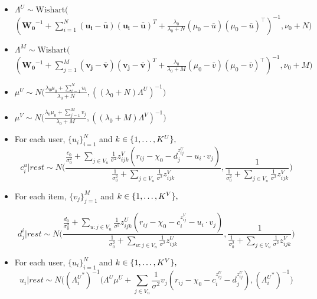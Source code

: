 \documentclass{article}
\begin{document}
\begin{itemize}

\item $\Lambda^U \sim \text{Wishart} \Bigg($
$\left(\mathbf{W_0}^{-1} + \sum_{i=1}^N (\mathbf{u_i} - \mathbf{\bar u}) (\mathbf{u_i} - \mathbf{\bar u})^T + \frac{\lambda_0}{\lambda_0 + N}(\mu_0 - \bar u)(\mu_0 - \bar u)^\top \right)^{-1}, \nu_0 + N \Bigg) $

\item $\Lambda^M \sim \text{Wishart} \Bigg($
$\left(\mathbf{W_0}^{-1} + \sum_{j=1}^M (\mathbf{v_j} - \mathbf{\bar v}) (\mathbf{v_j} - \mathbf{\bar v})^T + \frac{\lambda_0}{\lambda_0 + M}(\mu_0 - \bar v)(\mu_0 - \bar v)^\top \right)^{-1}, \nu_0 + M \Bigg) $

\item $\mu^U \sim N \Big( \frac{\lambda_0 \mu_0 + \sum_{i=1}^N u_i}{\lambda_0 + N}, ((\lambda_0 + N) \Lambda^U)^{-1} \Big)$ \\

\item $\mu^V \sim N \Big( \frac{\lambda_0 \mu_0 + \sum_{j=1}^M v_j}{\lambda_0 + M}, ((\lambda_0 + M) \Lambda^V)^{-1} \Big)$ \\

\item For each user, $\{u_i\}_{i=1}^N$ and $k \in \{1, \ldots, K^U\}, \\$
    $$c_i^u | rest \sim N\Bigg(\frac{ \frac{c_0}{\sigma_0^2} + \sum_{j \in V_u} \frac{1}{\sigma^2} z_{ijk}^V(r_{ij} - \chi_0 - d_j^{z_{ij}^U} - u_i \cdot v_j)}{\frac{1}{\sigma_0^2} + \sum_{j \in V_u} \frac{1}{\sigma^2} z_{ijk}^V}, \frac{1}{\frac{1}{\sigma_0^2} + \sum_{j \in V_u} \frac{1}{\sigma^2} z_{ijk}^V}    \Bigg) $$
\item For each item, $\{v_j\}_{j=1}^M$ and $k \in \{1,\ldots, K^V\}, \\$
    
    \indent
    $$d_j^i | rest \sim N\Bigg(          
\frac{\frac{d_0}{\sigma_0^2} + \sum_{u: j \in V_u} \frac{1}{\sigma^2} z_{ijk}^U(r_{ij} - \chi_0 - c_i^{z_{ij}^V} - u_i \cdot v_j)}{\frac{1}{\sigma_0^2} + \sum_{u: j \in V_u} \frac{1}{\sigma^2} z_{ijk}^U}
, \frac{1}{\frac{1}{\sigma_0^2} + \sum_{j \in V_u} \frac{1}{\sigma^2} z_{ijk}^V}    \Bigg) $$
\item For each user, $\{u_i\}_{i=1}^N$ and $k \in \{1, \ldots, K^V\}, \\$
    $$u_i | rest \sim N \Bigg(({\Lambda_i^U}^*)^{-1} (\Lambda^U \mu^U + \sum_{j \in V_u} \frac{1}{\sigma^2} v_j(r_{ij} - \chi_0 - c_i^{z_{ij}^U} - d_j^{z_{ij}^U}), ({\Lambda_i^U}^*)^{-1} \Bigg)$$ \\


\end{itemize}
\end{document}
